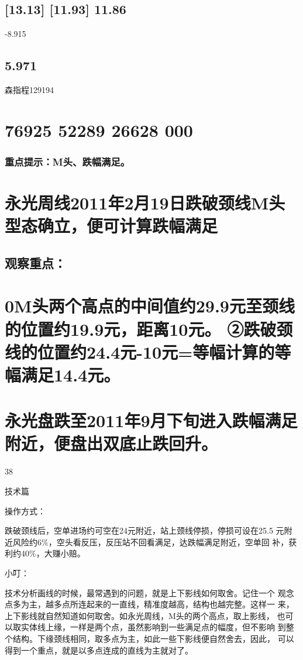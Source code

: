 \documentclass{article}
\begin{document}
\subsection{[13.13] [11.93] 11.86}

-8.915

\subsection{5.971}

森指程129194

\section{76925 52289 26628 000}

\subsubsection{重点提示：M头、跌幅满足。}

\section{永光周线2011年2月19日跌破颈线M头型态确立，便可计算跌幅满足}

\subsection{观察重点：}

\section{0M头两个高点的中间值约29.9元至颈线的位置约19.9元，距离10元。 ②跌破颈线的位置约24.4元-10元=等幅计算的等幅满足14.4元。}

\section{永光盘跌至2011年9月下旬进入跌幅满足附近，便盘出双底止跌回升。}

38

\clearpage

技术篇

操作方式：

跌破颈线后，空单进场约可空在24元附近，站上颈线停损，停损可设在25.5 元附近风险约6\%，空头看反压，反压站不回看满足，达跌幅满足附近，空单回 补，获利约40\%，大赚小赔。

小叮：

技术分析画线的时候，最常遇到的问题，就是上下影线如何取舍。记住一个 观念点多为主，越多点所连起来的一直线，精准度越高，结构也越完整。这样一 来，上下影线就自然知道如何取舍。如永光周线，M头的两个高点，取上影线， 也可以取实体线上缘，一样是两个点，虽然影响到一些满足点的幅度，但不影响 到整个结构。下缘颈线相同，取多点为主，如此一些下影线便自然舍去，因此， 可以得到一个重点，就是以多点连成的直线为主就对了。
\end{document}
